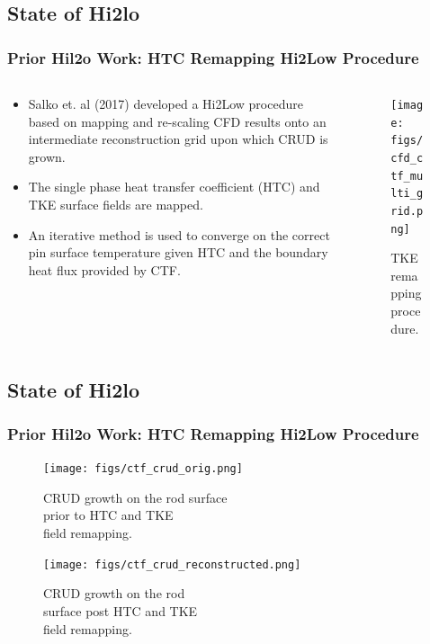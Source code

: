 \documentclass[t, pdftex]{beamer}
\begin{document}
\subsection*{State of Hi2lo}
\begin{frame}[shrink=10]
\frametitle{Prior Hil2o Work: HTC Remapping Hi2Low Procedure}
\begin{columns}
    \begin{column}{0.5\textwidth}
        \begin{itemize}
            \item Salko et. al (2017) developed a Hi2Low procedure based on mapping and re-scaling CFD results onto an intermediate reconstruction grid upon which CRUD is grown.
            \item The single phase heat transfer coefficient (HTC) and TKE surface fields are mapped.
            \item An iterative method is used to converge on the correct pin surface temperature given HTC and the boundary heat flux provided by CTF.
        \end{itemize}
    \end{column}
    \begin{column}{0.5\textwidth}  %
        \begin{center}
            \begin{figure}
                \texttt{[image: figs/cfd\_ctf\_multi\_grid.png]}
                \caption{\centering TKE remapping procedure.}      
            \end{figure}
        \end{center}
    \end{column}
\end{columns}
\end{frame}

\subsection*{State of Hi2lo}
\begin{frame}
\frametitle{Prior Hil2o Work: HTC Remapping Hi2Low Procedure}
\begin{figure}[!htbp]
\centering
\begin{minipage}{.5\textwidth}
    \texttt{[image: figs/ctf\_crud\_orig.png]}
    \caption{\centering \scriptsize{ CRUD growth on the rod surface \\ prior to HTC and TKE \\ field remapping.}}
    \label{fig:crud_pre_map}
\end{minipage}%
\begin{minipage}{.5\textwidth}
    \texttt{[image: figs/ctf\_crud\_reconstructed.png]}
    \caption{\centering \scriptsize CRUD growth on the rod \\ surface post HTC and TKE \\ field remapping.}
    \label{fig:crud_post_map}
\end{minipage}
\end{figure}
\end{frame}
\end{document}
